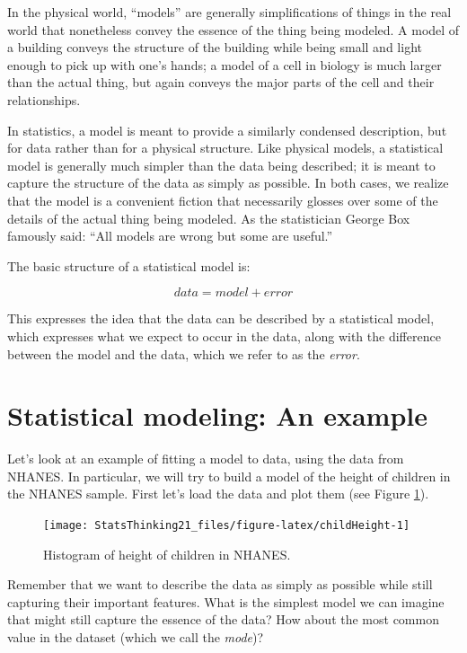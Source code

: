 \documentclass[12pt,]{book}
\theoremstyle{definition}
\theoremstyle{definition}
\theoremstyle{definition}
\theoremstyle{remark}
\begin{document}
In the physical world, ``models'' are generally simplifications of things in the real world that nonetheless convey the essence of the thing being modeled. A model of a building conveys the structure of the building while being small and light enough to pick up with one's hands; a model of a cell in biology is much larger than the actual thing, but again conveys the major parts of the cell and their relationships.

In statistics, a model is meant to provide a similarly condensed description, but for data rather than for a physical structure. Like physical models, a statistical model is generally much simpler than the data being described; it is meant to capture the structure of the data as simply as possible. In both cases, we realize that the model is a convenient fiction that necessarily glosses over some of the details of the actual thing being modeled. As the statistician George Box famously said: ``All models are wrong but some are useful.''

The basic structure of a statistical model is:

\[
data = model + error
\]

This expresses the idea that the data can be described by a statistical model, which expresses what we expect to occur in the data, along with the difference between the model and the data, which we refer to as the \emph{error}.

\hypertarget{statistical-modeling-an-example}{%
\section{Statistical modeling: An example}\label{statistical-modeling-an-example}}

Let's look at an example of fitting a model to data, using the data from NHANES. In particular, we will try to build a model of the height of children in the NHANES sample. First let's load the data and plot them (see Figure \ref{fig:childHeight}).

\begin{figure}
\texttt{[image: StatsThinking21\_files/figure-latex/childHeight-1]} \caption{Histogram of height of children in NHANES.}\label{fig:childHeight}
\end{figure}

Remember that we want to describe the data as simply as possible while still capturing their important features. What is the simplest model we can imagine that might still capture the essence of the data? How about the most common value in the dataset (which we call the \emph{mode})?
\end{document}
